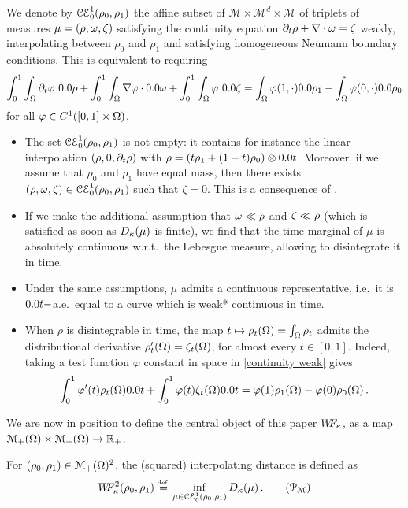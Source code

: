 \begin{definition}
We denote by $\mathcal{CE}_0^1(\rho_0,\rho_1)$ the affine subset of $\mathcal{M}\times \mathcal{M}^d \times \mathcal{M}$ of triplets of measures $\mu=(\rho,\omega,\zeta)$ satisfying the continuity equation $\partial_t \rho + \nabla \cdot \omega = \zeta$ weakly, interpolating between $\rho_0$ and $\rho_1$ and satisfying homogeneous Neumann boundary conditions. This is equivalent to requiring
\begin{equation}
\label{continuity weak}
\int_0^1 \int_{\Om} \D_t \varphi \ \d\rho + \int_0^1 \int_{\Om} \nabla \varphi \cdot \d\M + \int_0^1 \int_{\Om} \varphi \ \d\Z = \int_{\Om} \varphi(1,\cdot)\d\rho_1 - \int_{\Om} \varphi(0,\cdot)\d\rho_0
\end{equation}
for all $\varphi \in C^1([0,1]\times \Omega)$.
\end{definition}
%
\begin{remarks}\mbox{}
\begin{itemize}
\item The set $\mathcal{CE}_0^1(\rho_0,\rho_1)$ is not empty: it contains for instance the linear interpolation $(\rho,0,\partial_t \rho)$ with $\rho = (t \rho_1 + (1-t) \rho_0 ) \otimes \d t$. Moreover, if we assume that $\rho_0$ and $\rho_1$ have equal mass, then there exists $(\rho,\omega,\zeta) \in \mathcal{CE}_0^1(\rho_0,\rho_1)$ such that $\zeta =0$. This is a consequence of \cite[Theorem 8.3.1]{ambrosio2006gradient}.
\item If we make the additional assumption that $\omega\ll\rho$ and $\zeta \ll \rho$ (which is satisfied as soon as $D_{\kappa}(\mu)$ is finite), we find that the time marginal of $\mu$ is absolutely continuous w.r.t.\ the Lebesgue measure, allowing to disintegrate it in time.
\item Under the same assumptions, $\mu$ admits a continuous representative, i.e.\ it is $\d t-$a.e.\ equal to a curve which is weak* continuous in time. 
\item When $\rho$ is disintegrable in time, the map $t \mapsto \rho_t(\Omega) = \int_{\Omega} \rho_t$ admits the distributional derivative $\rho'_t (\Omega) = \zeta_t(\Omega)$, for almost every $t\in[0,1]$. Indeed, taking a test function $\varphi$ constant in space in \eqref{continuity weak} gives
\[
\int_0^1 \varphi'(t) \rho_t(\Om)\d t + \int_0^1 \varphi(t) \Z_t(\Om)\d t = \varphi(1)\rho_1(\Om) -\varphi(0)\rho_0(\Om)\, .
\]
\end{itemize}
\end{remarks}
%
We are now in position to define the central object of this paper $W\! \! F_{\kappa}$, as a map $\mathcal{M}_+(\Omega) \times \mathcal{M}_+(\Omega) \rightarrow \mathbb{R}_+$.
\begin{definition}
For $(\rho_0,\rho_1) \in \mathcal{M}_+(\Omega)^2$, the (squared) interpolating distance is defined as
\begin{equation*}
\label{dual}
\WF_{\kappa}^2(\rho_0,\rho_1) \defeq \inf_{\mu \in \ccons} \ifonc (\mu) \, . \tag{$\mathcal{P}_{\mathcal{M}}$}
\end{equation*}
\end{definition}
%

